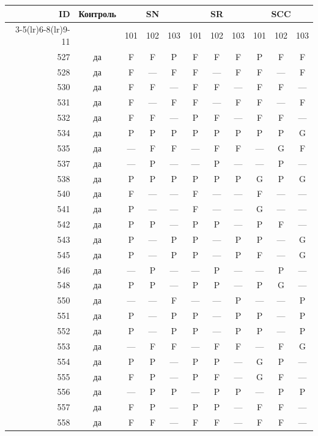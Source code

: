 \begin{table}[p]\centering\small
\begin{tabular*}{\textwidth}{@{\extracolsep{\fill}}rc*{9}{c}@{}}\toprule
ID & Контроль & \multicolumn{3}{c}{SN} & \multicolumn{3}{c}{SR} & \multicolumn{3}{c}{SCC}\\
\cmidrule(lr){3-5}\cmidrule(lr){6-8}\cmidrule(lr){9-11}
 & & 101 & 102 & 103 & 101 & 102 & 103 & 101 & 102 & 103\\\midrule
527 & да & F & F & P & F & F & F & P & F & F\\
528 & да & F & — & F & F & — & F & F & — & F\\
530 & да & F & F & — & F & F & — & F & F & —\\
531 & да & F & — & F & F & — & F & F & — & F\\
532 & да & F & F & — & P & F & — & F & F & —\\
534 & да & P & P & P & P & P & P & P & P & G\\
535 & да & — & F & F & — & F & F & — & G & F\\
537 & да & — & P & — & — & P & — & — & P & —\\
538 & да & P & P & P & P & P & P & G & P & G\\
540 & да & F & — & — & F & — & — & F & — & —\\
541 & да & P & — & — & F & — & — & G & — & —\\
542 & да & P & P & — & P & P & — & P & F & —\\
543 & да & P & — & P & P & — & P & P & — & G\\
545 & да & P & — & P & P & — & P & F & — & G\\
546 & да & — & P & — & — & P & — & — & P & —\\
548 & да & P & P & — & P & P & — & P & G & —\\
550 & да & — & — & F & — & — & P & — & — & P\\
551 & да & P & — & P & P & — & P & P & — & P\\
552 & да & P & — & P & P & — & P & P & — & P\\
553 & да & — & F & F & — & F & F & — & F & G\\
554 & да & P & P & — & P & P & — & G & P & —\\
555 & да & F & P & — & P & F & — & G & F & —\\
556 & да & — & P & P & — & P & P & — & P & P\\
557 & да & F & P & — & P & P & — & F & F & —\\
558 & да & F & F & — & F & F & — & F & F & —\\

\end{tabular*}
\end{table}
